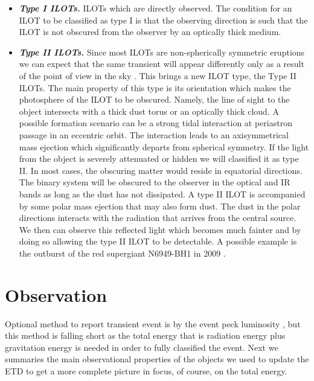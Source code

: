 \documentclass[modern]{aastex63}
\newcommand{\emphbf}[1]{\textbf{\emph{#1}}}
\begin{document}
\begin{itemize}

\item \label{type_i-ilot-item} \emphbf{Type I ILOTs.} 
ILOTs which are directly observed. 
The condition for an ILOT to be classified as type I is that the observing direction is such that the ILOT is not obscured from the observer by an optically thick medium.

\item \label{type_ii-ilot-item} \emphbf{Type II ILOTs.}  
Since most ILOTs are non-spherically symmetric eruptions we can expect that the same transient will appear differently only as a result of the point of view in the sky \citep{2017MNRAS.467.3299K}. 
This brings a new ILOT type, the Type II ILOTs.
The main property of this type is its orientation which makes the photosphere of the ILOT to be obscured.
Namely, the line of sight to the object intersects with a thick dust torus or an optically thick cloud.
A possible formation scenario can be a strong tidal interaction at periastron passage in an eccentric orbit. 
The interaction leads to an axisymmetrical mass ejection which significantly departs from spherical symmetry.
If the light from the object is severely attenuated or hidden we will classified it as type II.
In most cases, the obscuring matter would reside in equatorial directions. 
The binary system will be obscured to the observer in the optical and IR bands as long as the dust has not dissipated.
A type II ILOT is accompanied by some polar mass ejection that may also form dust.
The dust in the polar directions interacts with the radiation that arrives from the central source.
We then can observe this reflected light which becomes much fainter and by doing so allowing the type II ILOT to be detectable. 
A possible example is the outburst of the red supergiant N6949-BH1 in 2009 \citep{2017MNRAS.468.4968A}.

\end{itemize}

\section{Observation}
Optional method to report transient event is by the event peck luminosity \citep{2013IAUS..281....9K,2020MNRAS.492.3229H}, but this method is falling short as the total energy that is radiation energy plus gravitation energy is needed in order to fully classified the event.  
Next we summaries the main observational properties of the objects we used to update the ETD to get a more complete picture in focus, of course, on the total energy.
\end{document}
